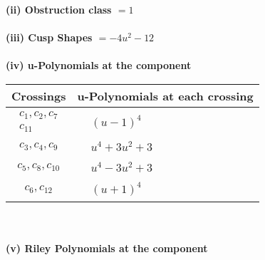 \documentclass[1p]{elsarticle_modified}
\theoremstyle{definition}
\begin{document}
\flushleft \textbf{(ii) Obstruction class $= 1$}\\~\\
\flushleft \textbf{(iii) Cusp Shapes $= -4 u^2-12$}\\~\\
\newpage\renewcommand{\arraystretch}{1}
\flushleft \textbf{(iv) u-Polynomials at the component}\newline \\
\begin{tabular}{m{50pt}|m{274pt}}
Crossings & \hspace{64pt}u-Polynomials at each crossing \\
\hline $$\begin{aligned}c_{1},c_{2},c_{7}\\c_{11}\end{aligned}$$&$\begin{aligned}
&(u-1)^4
\end{aligned}$\\
\hline $$\begin{aligned}c_{3},c_{4},c_{9}\end{aligned}$$&$\begin{aligned}
&u^4+3 u^2+3
\end{aligned}$\\
\hline $$\begin{aligned}c_{5},c_{8},c_{10}\end{aligned}$$&$\begin{aligned}
&u^4-3 u^2+3
\end{aligned}$\\
\hline $$\begin{aligned}c_{6},c_{12}\end{aligned}$$&$\begin{aligned}
&(u+1)^4
\end{aligned}$\\
\hline
\end{tabular}\\~\\
\newpage\renewcommand{\arraystretch}{1}
\flushleft \textbf{(v) Riley Polynomials at the component}\newline \\
\end{document}
